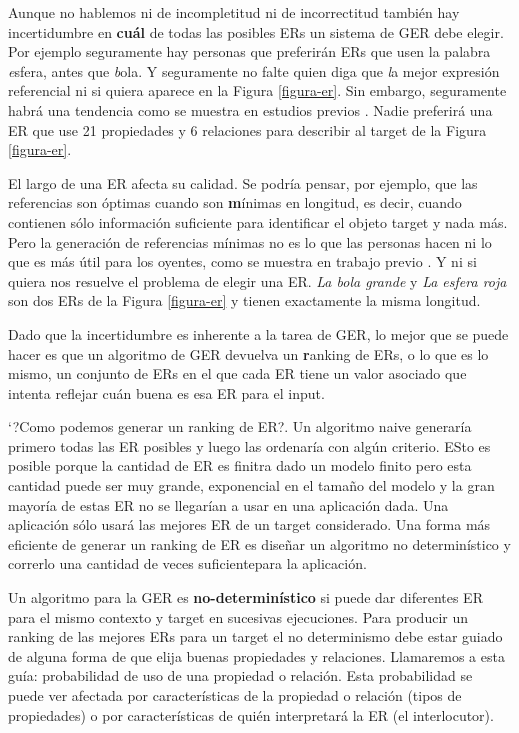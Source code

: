 Aunque no hablemos ni de incompletitud ni de incorrectitud tambi\'en hay incertidumbre en \textbf{cu\'al} de todas las posibles ERs un sistema de GER debe 
elegir. Por ejemplo seguramente hay personas que preferir\'an ERs que usen la palabra {\emph esfera}, antes que {\emph bola}. Y seguramente 
no falte quien diga que {\emph la} mejor expresi\'on referencial ni si quiera aparece en la Figura \ref{figura-er}. Sin embargo, seguramente 
habr\'a una tendencia como se muestra en estudios previos \cite{viet:gene11}. Nadie preferir\'a una ER que use 21 propiedades y 6 relaciones 
para describir al target de la Figura \ref{figura-er}.

El largo de una ER afecta su calidad. Se podr\'{i}a pensar, por ejemplo, que las referencias son \'optimas cuando son {\textbf m\'{i}nimas}
 en longitud, es decir, cuando 
contienen s\'olo informaci\'on suficiente para identificar el objeto target y nada m\'as. Pero la generaci\'on de referencias m\'{i}nimas
no es lo que las personas hacen ni lo que es m\'as \'util para los oyentes, como se muestra en trabajo previo \cite{Lu_sasha2015}. Y ni si quiera 
nos resuelve el problema de elegir una ER. {\it La bola grande} y {\it La esfera roja} son dos ERs de la Figura \ref{figura-er} y tienen 
exactamente la misma longitud.

Dado que la incertidumbre es inherente a la tarea de GER, lo mejor que se puede hacer es que un algoritmo de GER devuelva un {\textbf ranking}
 de ERs, o lo que es lo mismo, un conjunto de ERs en el que cada ER tiene un valor asociado que intenta reflejar cu\'an buena es esa ER para 
el input.

`?Como podemos generar un ranking de ER?.
Un algoritmo naive generar\'ia primero todas las ER posibles y luego las ordenar\'ia con alg\'un criterio. ESto es posible porque la cantidad de ER es finitra dado un modelo finito pero esta cantidad puede ser muy grande, exponencial en el tama\~{n}o del modelo y la gran mayor\'ia de estas ER no se llegar\'ian a usar en una aplicaci\'on dada. Una aplicaci\'on s\'olo usar\'a las mejores ER de un target considerado.
Una forma m\'as eficiente de generar un ranking de ER es dise\~{n}ar un algoritmo no determin\'istico y correrlo una cantidad de veces suficientepara la aplicaci\'on.

Un algoritmo para la GER es {\bf no-determin\'istico} si puede dar diferentes ER para el mismo contexto y target en sucesivas ejecuciones. 
Para producir un ranking de las mejores ERs para un target el no determinismo debe estar guiado de alguna forma de que elija buenas propiedades y relaciones. Llamaremos a esta gu\'ia: probabilidad de uso de una propiedad o relaci\'on. Esta probabilidad se puede ver afectada por caracter\'isticas de la propiedad o relaci\'on (tipos de propiedades) o por caracter\'isticas de qui\'en interpretar\'a la ER (el interlocutor).

